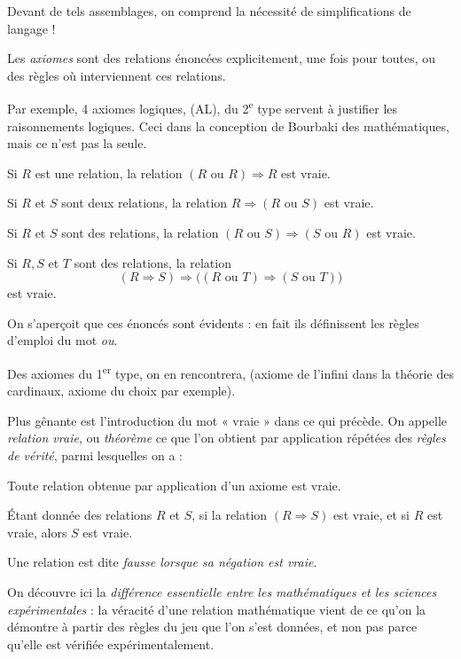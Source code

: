Devant de tels assemblages, on comprend la nécessité de simplifications de langage !

Les \emph{axiomes} sont des relations énoncées explicitement, une fois pour toutes, ou des règles où interviennent ces relations.

Par exemple, 4 axiomes logiques, (AL), du 2\textsuperscript{e} type servent à justifier les raisonnements logiques. Ceci dans la conception de Bourbaki des mathématiques, mais ce n'est pas la seule.

\begin{axiomlist}
\item[(AL1)] Si $R$ est une relation, la relation $(R\text{ ou }R)\Rightarrow R$ est vraie.
\item[(AL2)] Si $R$ et $S$ sont deux relations, la relation $R\Rightarrow(R\text{ ou }S)$ est vraie.
\item[(AL3)] Si $R$ et $S$ sont des relations, la relation $(R\text{ ou }S)\Rightarrow(S\text{ ou }R)$ est vraie.
\item[(AL4)] Si $R,S$ et $T$ sont des relations, la relation
\[
(R\Rightarrow S)\Rightarrow\bigl((R\text{ ou }T)\Rightarrow(S\text{ ou }T)\bigr)
\]
est vraie.
\end{axiomlist}

On s'aperçoit que ces énoncés sont évidents : en fait ils définissent les règles d'emploi du mot \emph{ou}.

Des axiomes du 1\textsuperscript{er} type, on en rencontrera, (axiome de l'infini dans la théorie des cardinaux, axiome du choix par exemple).

Plus gênante est l'introduction du mot « vraie » dans ce qui précède. On appelle \emph{relation vraie}, ou \emph{théorème} ce que l'on obtient par application répétées des \emph{règles de vérité}, parmi lesquelles on a :
\begin{axiomlist}
\item[(RV1)] Toute relation obtenue par application d'un axiome est vraie.
\item[(RV2)] Étant donnée des relations $R$ et $S$, si la relation $(R\Rightarrow S)$ est vraie, et si $R$ est vraie, alors $S$ est vraie.
\end{axiomlist}

Une relation est dite \emph{fausse lorsque sa négation est vraie}.

On découvre ici la \emph{différence essentielle entre les mathématiques et les sciences expérimentales} : la véracité d'une relation mathématique vient de ce qu'on la démontre à partir des règles du jeu que l'on s'est données, et non pas parce qu'elle est vérifiée expérimentalement.

